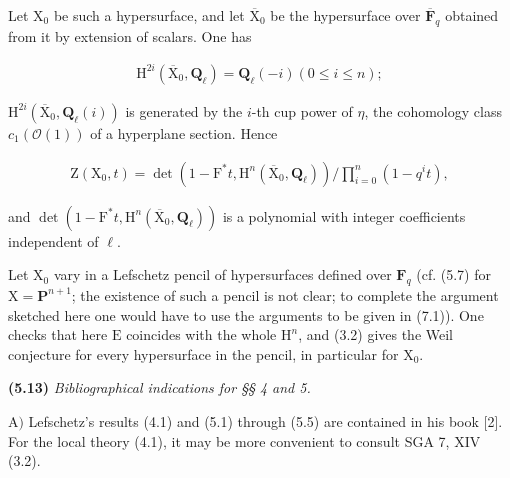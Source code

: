 \documentclass[10pt,leqno]{article}
\begin{document}
\noindent Let \(\mathrm{X}_{0}\) be such a hypersurface, and let \(\overline{\mathrm{X}}_{0}\) be the hypersurface over \(\overline{\mathbf{F}}_{q}\) obtained from it by extension of scalars. One has\par

\begin{equation*}\begin{gathered}\mathrm{H}^{2i}(\overline{\mathrm{X}}_{0},\mathbf{Q}_{\ell })=\mathbf{Q}_{\ell }(- i)    (0\leq i\leq n);\end{gathered}\end{equation*}

\noindent \(\mathrm{H}^{2i}(\overline{\mathrm{X}}_{0},\mathbf{Q}_{\ell }(i))\) is generated by the \(i\)-th cup power of \(\eta \), the cohomology class \(c_{1}(\mathcal{O}(1))\) of a hyperplane section. Hence\par

\begin{equation*}\begin{gathered}\mathrm{Z}(\mathrm{X}_{0},t)=\operatorname{det}(1- \mathrm{F}^{*}t,\mathrm{H}^{n}(\overline{\mathrm{X}}_{0},\mathbf{Q}_{\ell })) / \prod _{i=0}^{n}(1- q^{i} t),\end{gathered}\end{equation*}

\noindent and \(\operatorname{det}(1- \mathrm{F}^{*}t,\mathrm{H}^{n}(\overline{\mathrm{X}}_{0},\mathbf{Q}_{\ell }))\) is a polynomial with integer coefficients independent of \(\ell \).\par

\noindent Let \(\mathrm{X}_{0}\) vary in a Lefschetz pencil of hypersurfaces defined over \(\mathbf{F}_{q}\) (cf. (5.7) for \(\mathrm{X}=\mathbf{P}^{n+1}\); the existence of such a pencil is not clear; to complete the argument sketched here one would have to use the arguments to be given in (7.1)). One checks that here \(\mathrm{E}\) coincides with the whole \(\mathrm{H}^{n}\), and (3.2) gives the Weil conjecture for every hypersurface in the pencil, in particular for \(\mathrm{X}_{0}\).\par

\noindent \textbf{(5.13)} \emph{Bibliographical indications for §§ 4 and 5.}\par

\noindent \(\mathrm{A})\) Lefschetz's results (4.1) and (5.1) through (5.5) are contained in his book [2]. For the local theory (4.1), it may be more convenient to consult SGA 7, XIV (3.2).\par
\end{document}
